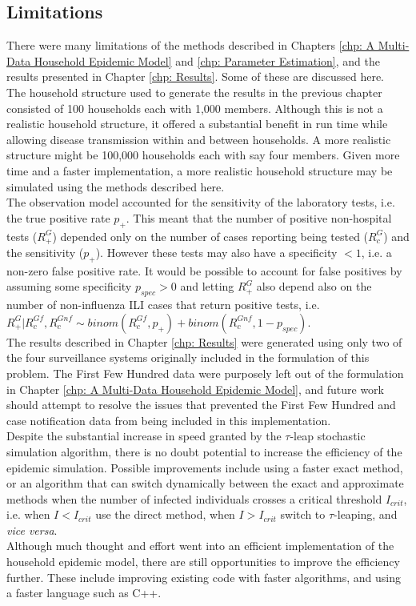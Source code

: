 \subsection{Limitations}
There were many limitations of the methods described in Chapters \ref{chp: A Multi-Data Household Epidemic Model} and \ref{chp: Parameter Estimation}, and the results presented in Chapter \ref{chp: Results}. Some of these are discussed here.\\
The household structure used to generate the results in the previous chapter consisted of 100 households each with 1,000 members. Although this is not a realistic household structure, it offered a substantial benefit in run time while allowing disease transmission within and between households. A more realistic structure might be 100,000 households each with say four members. Given more time and a faster implementation, a more realistic household structure may be simulated using the methods described here.\\
The observation model accounted for the sensitivity of the laboratory tests, i.e. the true positive rate $p_+$. This meant that the number of positive non-hospital tests ($R_+^G$) depended only on the number of cases reporting being tested ($R_c^G$) and the sensitivity ($p_+$). However these tests may also have a specificity $<1$, i.e. a non-zero false positive rate. It would be possible to account for false positives by assuming some specificity $p_{spec} > 0$ and letting $R_+^G$ also depend also on the number of non-influenza ILI cases that return positive tests, i.e. $R_+^G | R_c^{Gf}, R_c^{Gnf} \sim binom(R_c^{Gf}, p_+) + binom(R_c^{Gnf}, 1-p_{spec})$. \\
The results described in Chapter \ref{chp: Results} were generated using only two of the four surveillance systems originally included in the formulation of this problem. The First Few Hundred data were purposely left out of the formulation in Chapter \ref{chp: A Multi-Data Household Epidemic Model}, and future work should attempt to resolve the issues that prevented the First Few Hundred and case notification data from being included in this implementation. \\
Despite the substantial increase in speed granted by the $\tau$-leap stochastic simulation algorithm, there is no doubt potential to increase the efficiency of the epidemic simulation. Possible improvements include using a faster exact method, or an algorithm that can switch dynamically between the exact and approximate methods when the number of infected individuals crosses a critical threshold $I_{crit}$, i.e. when $I < I_{crit}$ use the direct method, when $I>I_{crit}$ switch to $\tau$-leaping, and \textit{vice versa}.\\
Although much thought and effort went into an efficient implementation of the household epidemic model, there are still opportunities to improve the efficiency further. These include improving existing code with faster algorithms, and using a faster language such as C++.

